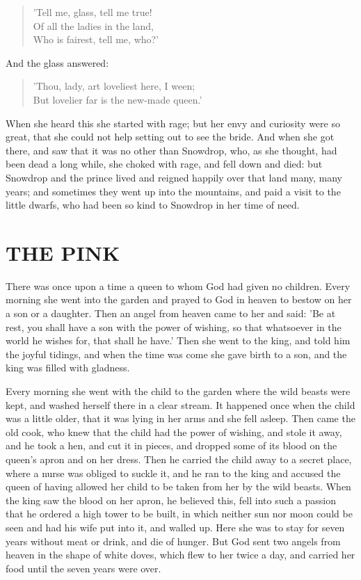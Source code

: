 \documentclass[12pt]{book}
\begin{document}
\begin{verse}
 'Tell me, glass, tell me true!\\
  Of all the ladies in the land,\\
  Who is fairest, tell me, who?'
\end{verse}

And the glass answered:

\begin{verse}
 'Thou, lady, art loveliest here, I ween;\\
  But lovelier far is the new-made queen.'
\end{verse}

When she heard this she started with rage; but her envy and curiosity
were so great, that she could not help setting out to see the bride.
And when she got there, and saw that it was no other than Snowdrop,
who, as she thought, had been dead a long while, she choked with rage,
and fell down and died: but Snowdrop and the prince lived and reigned
happily over that land many, many years; and sometimes they went up
into the mountains, and paid a visit to the little dwarfs, who had
been so kind to Snowdrop in her time of need.



\chapter{THE PINK}

There was once upon a time a queen to whom God had given no children.
Every morning she went into the garden and prayed to God in heaven to
bestow on her a son or a daughter. Then an angel from heaven came to
her and said: 'Be at rest, you shall have a son with the power of
wishing, so that whatsoever in the world he wishes for, that shall he
have.' Then she went to the king, and told him the joyful tidings, and
when the time was come she gave birth to a son, and the king was
filled with gladness.

Every morning she went with the child to the garden where the wild
beasts were kept, and washed herself there in a clear stream. It
happened once when the child was a little older, that it was lying in
her arms and she fell asleep. Then came the old cook, who knew that
the child had the power of wishing, and stole it away, and he took a
hen, and cut it in pieces, and dropped some of its blood on the
queen's apron and on her dress. Then he carried the child away to a
secret place, where a nurse was obliged to suckle it, and he ran to
the king and accused the queen of having allowed her child to be taken
from her by the wild beasts. When the king saw the blood on her apron,
he believed this, fell into such a passion that he ordered a high
tower to be built, in which neither sun nor moon could be seen and had
his wife put into it, and walled up. Here she was to stay for seven
years without meat or drink, and die of hunger. But God sent two
angels from heaven in the shape of white doves, which flew to her
twice a day, and carried her food until the seven years were over.
\end{document}

